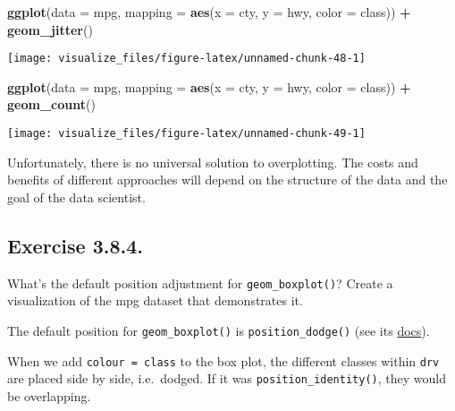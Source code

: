\documentclass[]{book}
\newenvironment{Shaded}{\begin{snugshade}}{\end{snugshade}}
\newcommand{\DataTypeTok}[1]{\textcolor[rgb]{0.13,0.29,0.53}{#1}}
\newcommand{\KeywordTok}[1]{\textcolor[rgb]{0.13,0.29,0.53}{\textbf{#1}}}
\newcommand{\NormalTok}[1]{#1}
\newcommand{\OperatorTok}[1]{\textcolor[rgb]{0.81,0.36,0.00}{\textbf{#1}}}
\newcommand{\StringTok}[1]{\textcolor[rgb]{0.31,0.60,0.02}{#1}}
\theoremstyle{plain}
\theoremstyle{remark}
\theoremstyle{definition}
\theoremstyle{definition}
\theoremstyle{definition}
\theoremstyle{remark}
\begin{document}
\begin{Shaded}
\begin{Highlighting}[]
\KeywordTok{ggplot}\NormalTok{(}\DataTypeTok{data =}\NormalTok{ mpg, }\DataTypeTok{mapping =} \KeywordTok{aes}\NormalTok{(}\DataTypeTok{x =}\NormalTok{ cty, }\DataTypeTok{y =}\NormalTok{ hwy, }\DataTypeTok{color =}\NormalTok{ class)) }\OperatorTok{+}
\StringTok{  }\KeywordTok{geom_jitter}\NormalTok{()}
\end{Highlighting}
\end{Shaded}

\begin{center}\texttt{[image: visualize\_files/figure-latex/unnamed-chunk-48-1]} \end{center}

\begin{Shaded}
\begin{Highlighting}[]
\KeywordTok{ggplot}\NormalTok{(}\DataTypeTok{data =}\NormalTok{ mpg, }\DataTypeTok{mapping =} \KeywordTok{aes}\NormalTok{(}\DataTypeTok{x =}\NormalTok{ cty, }\DataTypeTok{y =}\NormalTok{ hwy, }\DataTypeTok{color =}\NormalTok{ class)) }\OperatorTok{+}
\StringTok{  }\KeywordTok{geom_count}\NormalTok{()}
\end{Highlighting}
\end{Shaded}

\begin{center}\texttt{[image: visualize\_files/figure-latex/unnamed-chunk-49-1]} \end{center}

Unfortunately, there is no universal solution to overplotting. The costs
and benefits of different approaches will depend on the structure of the
data and the goal of the data scientist.

\hypertarget{exercise-3.8.4.}{%
\subsection*{\texorpdfstring{Exercise
{3.8.4}.}{Exercise 3.8.4.}}\label{exercise-3.8.4.}}

What's the default position adjustment for \texttt{geom\_boxplot()}?
Create a visualization of the mpg dataset that demonstrates it.

The default position for \texttt{geom\_boxplot()} is
\texttt{position\_dodge()} (see its
\href{http://docs.ggplot2.org/current/geom_boxplot.html}{docs}).

When we add \texttt{colour\ =\ class} to the box plot, the different
classes within \texttt{drv} are placed side by side, i.e.~dodged. If it
was \texttt{position\_identity()}, they would be overlapping.
\end{document}
